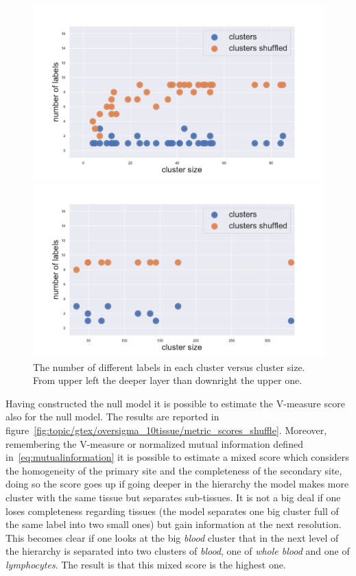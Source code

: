 \begin{figure}[htb!]
\begin{minipage}{0.45\textwidth}
    \includegraphics[width=0.9\linewidth]{pictures/topic/gtex/oversigma_10tissue/shuffledcluster_shuffle_label_size_l2_primary_site.pdf}
    \end{minipage}
    \hspace{3mm}
    \begin{minipage}{0.45\textwidth}
    \includegraphics[width=0.9\linewidth]{pictures/topic/gtex/oversigma_10tissue/shuffledcluster_shuffle_label_size_l3_primary_site.pdf}
    \end{minipage}
\caption{The number of different labels in each cluster versus cluster size. From upper left the deeper layer than downright the upper one.}
\label{fig:topic/gtex/oversigma_10tissue/shuffledcluster_shuffle_label_size_lall}
\end{figure}
\FloatBarrier
Having constructed the null model it is possible to estimate the V-measure score also for the null model. The results are reported in figure~\ref{fig:topic/gtex/oversigma_10tissue/metric_scores_shuffle}. 
Moreover, remembering the V-measure or normalized mutual information defined in~\ref{eq:mutualinformation} it is possible to estimate a mixed score which considers the homogeneity of the primary site and the completeness of the secondary site, doing so the score goes up if going deeper in the hierarchy the model makes more cluster with the same tissue but separates sub-tissues. It is not a big deal if one loses completeness regarding tissues (the model separates one big cluster full of the same label into two small ones) but gain information at the next resolution. This becomes clear if one looks at the big \textit{blood} cluster that in the next level of the hierarchy is separated into two clusters of \textit{blood}, one of \textit{whole blood} and one of \textit{lymphocytes}. The result is that this mixed score is the highest one.
